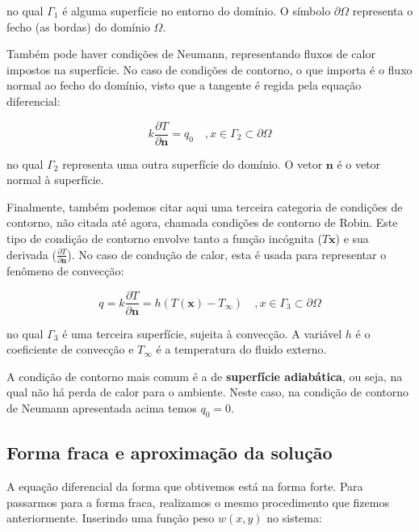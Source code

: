         \noindent no qual $\Gamma_1$ é alguma superfície no entorno do domínio. O símbolo $\partial \Omega$ representa o fecho (as bordas) do domínio $\Omega$.

        Também pode haver condições de Neumann, representando fluxos de calor impostos na superfície. No caso de condições de contorno, o que importa é o fluxo normal ao fecho do domínio, visto que a tangente é regida pela equação diferencial:

        \begin{equation}
            k\frac{\partial T}{\partial \mathbf{n}} = q_0 \quad, x \in \Gamma_2 \subset \partial \Omega
        \end{equation}

        \noindent no qual $\Gamma_2$ representa uma outra superfície do domínio. O vetor $\mathbf{n}$ é o vetor normal à superfície.

        Finalmente, também podemos citar aqui uma terceira categoria de condições de contorno, não citada até agora, chamada condições de contorno de Robin. Este tipo de condição de contorno envolve tanto a função incógnita ($T\mathbf{x}$) e sua derivada ($\frac{\partial T}{\partial \mathbf{n}}$). No caso de condução de calor, esta é usada para representar o fenômeno de convecção:

        \begin{equation}
            q = k\frac{\partial T}{\partial \mathbf{n}} = h\left(T(\mathbf{x}) - T_\infty\right) \quad, x \in \Gamma_3 \subset \partial \Omega
            \label{eq:conveccao}
        \end{equation}

        \noindent no qual $\Gamma_3$ é uma terceira superfície, sujeita à convecção. A variável $h$ é o coeficiente de convecção e $T_\infty$ é a temperatura do fluido externo.

        A condição de contorno mais comum é a de \textbf{superfície adiabática}, ou seja, na qual não há perda de calor para o ambiente. Neste caso, na condição de contorno de Neumann apresentada acima temos $q_0 = 0$.

    \subsection{Forma fraca e aproximação da solução}

        A equação diferencial da forma que obtivemos está na forma forte. Para passarmos para a forma fraca, realizamos o mesmo procedimento que fizemos anteriormente. Inserindo uma função peso $w(x,y)$ no sistema:

